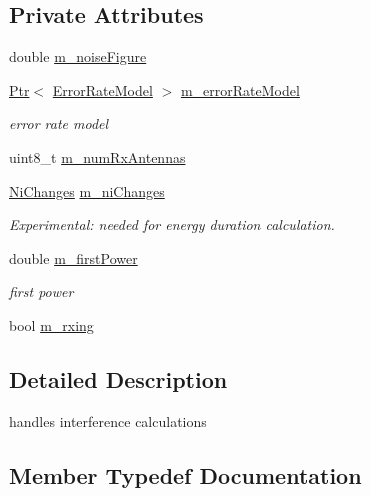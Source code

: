 \subsection*{Private Attributes}
\begin{DoxyCompactItemize}
\item 
double \hyperlink{classns3_1_1InterferenceHelper_a2112c6ae475fb8ce5434246237ce1c91}{m\+\_\+noise\+Figure}
\item 
\hyperlink{classns3_1_1Ptr}{Ptr}$<$ \hyperlink{classns3_1_1ErrorRateModel}{Error\+Rate\+Model} $>$ \hyperlink{classns3_1_1InterferenceHelper_a77201b812b56550608a3f53394868c4e}{m\+\_\+error\+Rate\+Model}
\begin{DoxyCompactList}\small\item\em error rate model \end{DoxyCompactList}\item 
uint8\+\_\+t \hyperlink{classns3_1_1InterferenceHelper_a3c4c246de043decec1d726c10cda34f7}{m\+\_\+num\+Rx\+Antennas}
\item 
\hyperlink{classns3_1_1InterferenceHelper_ac32f50ca00a8e76bb133230d27cce2a9}{Ni\+Changes} \hyperlink{classns3_1_1InterferenceHelper_adce3da8c009ac49e76c6feb633b82e55}{m\+\_\+ni\+Changes}
\begin{DoxyCompactList}\small\item\em Experimental\+: needed for energy duration calculation. \end{DoxyCompactList}\item 
double \hyperlink{classns3_1_1InterferenceHelper_af11d32b96c9e19110deda5cd412574c1}{m\+\_\+first\+Power}
\begin{DoxyCompactList}\small\item\em first power \end{DoxyCompactList}\item 
bool \hyperlink{classns3_1_1InterferenceHelper_a27ce49a3e1c7e7c6a178bc62071d89a6}{m\+\_\+rxing}
\end{DoxyCompactItemize}


\subsection{Detailed Description}
handles interference calculations 

\subsection{Member Typedef Documentation}
